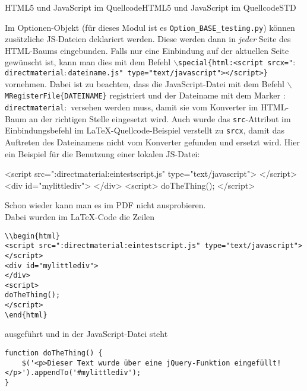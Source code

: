 \begin{MXContent}{HTML5 und JavaScript im Quellcode}{HTML5 und JavaScript im Quellcode}{STD}
\begin{MExample}
Im Optionen-Objekt (für dieses Modul ist es \texttt{Option\_BASE\_testing.py}) können zusätzliche JS-Dateien deklariert werden.
Diese werden dann in \textit{jeder} Seite des HTML-Baums eingebunden. Falls nur eine Einbindung auf der aktuellen Seite gewünscht ist,
kann man dies mit dem Befehl
\texttt{$\backslash$special\{html:<script srcx="{}$:$directmaterial$:$dateiname.js"{} type="{}text/javascript"{}></script>\}}
vornehmen. Dabei ist zu beachten, dass die JavaScript-Datei mit dem Befehl \texttt{$\backslash$MRegisterFile\{DATEINAME\}} registriert
und der Dateiname mit dem Marker \texttt{$:$directmaterial$:$} versehen werden
muss, damit sie vom Konverter im HTML-Baum an der richtigen Stelle eingesetzt wird.
Auch wurde das \texttt{src}-Attribut im Einbindungsbefehl im LaTeX-Quellcode-Beispiel verstellt zu \texttt{srcx}, damit das Auftreten des Dateinamens
nicht vom Konverter gefunden und ersetzt wird.
Hier ein Beispiel für die Benutzung einer lokalen JS-Datei:
\ifttm
\begin{html}
<script src=":directmaterial:eintestscript.js" type="text/javascript">
</script>
<div id="mylittlediv">
</div>
<script>
doTheThing();
</script>
\end{html}
\else
Schon wieder kann man es im PDF nicht ausprobieren.
\fi
\ \\
Dabei wurden im LaTeX-Code die Zeilen
\begin{verbatim}
\\begin{html}
<script src=":directmaterial:eintestscript.js" type="text/javascript">
</script>
<div id="mylittlediv">
</div>
<script>
doTheThing();
</script>
\end{html}
\end{verbatim}
ausgeführt und in der JavaScript-Datei steht
\begin{verbatim}
function doTheThing() {
    $('<p>Dieser Text wurde über eine jQuery-Funktion eingefüllt!</p>').appendTo('#mylittlediv');
}
\end{verbatim}
\end{MExample}

\end{MXContent}

